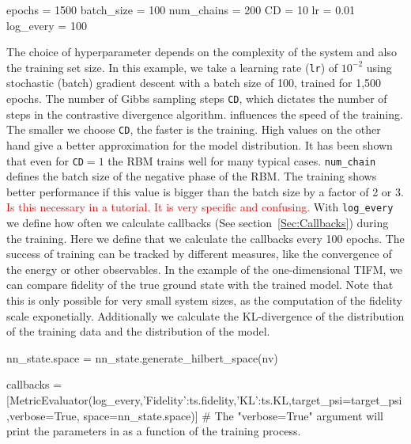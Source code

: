 \documentclass[submission, Phys]{SciPost}
\begin{document}
\begin{python}
epochs     = 1500
batch_size = 100
num_chains = 200
CD         = 10
lr         = 0.01
log_every  = 100
\end{python}

The choice of hyperparameter depends on the complexity of the system and also the training set size.
In this example, we take a learning rate (\verb|lr|) of $10^{-2}$ using stochastic (batch) gradient descent with a batch size of 100, trained for 1,500 epochs.
The number of Gibbs sampling steps \verb|CD|, which dictates the number of steps in the contrastive divergence algorithm.
influences the speed of the training. The smaller we choose \verb|CD|, the faster is the training. High values on the other hand give a better approximation for the model distribution. It has been shown that even for \verb|CD|$=1$ the RBM trains well for many typical cases\cite{hinton2002training}. \verb|num_chain| defines the batch size of the negative phase of the RBM. The training shows better performance if this value is bigger than the batch size by a factor of 2 or 3. \textcolor{red}{Is this necessary in a tutorial. It is very specific and confusing.} With \verb|log_every| we define how often we calculate callbacks (See section~\ref{Sec:Callbacks}) during the training. Here we define that we calculate the callbacks every 100 epochs.
The success of training can be tracked by different measures, like the convergence of the energy or other observables.
In the example of the one-dimensional TIFM, we can compare fidelity of the true ground state with the trained model.
Note that this is only possible for very small system sizes, as the computation of the fidelity scale exponetially. Additionally we calculate the KL-divergence of the distribution of the training data and the distribution of the model.

\begin{python}
nn_state.space = nn_state.generate_hilbert_space(nv)

callbacks = [MetricEvaluator(log_every,{'Fidelity':ts.fidelity,'KL':ts.KL},target_psi=target_psi,verbose=True, 
                             space=nn_state.space)]
# The "verbose=True" argument will print the parameters in { } as a function of the training process.
\end{python}
\end{document}
